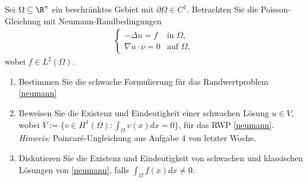 
\begin{exercise}

Sei $\Omega \subseteq \R^n$ ein beschränktes Gebiet mit $\partial\Omega \in C^1$.
Betrachten Sie die Poisson-Gleichung mit Neumann-Randbedingungen
\begin{align}
\begin{cases}
  -\Delta u = f & \text{in } \Omega, \\
  \nabla u \cdot \nu = 0 & \text{auf } \Omega,
\end{cases} \label{neumann}
\end{align}
wobei $f \in L^2(\Omega)$.
\begin{enumerate}[label = \alph*)]
  \item Bestimmen Sie die schwache Formulierung für das Randwertproblem \eqref{neumann}
  \item Beweisen Sie die Existenz und Eindeutigkeit einer schwachen Lösung $u \in V$,
  wobei $V := \{v \in H^1(\Omega): \int_\Omega v(x)dx = 0\}$, für das RWP \eqref{neumann}. \\
  \textit{Hinweis:} Poincaré-Ungleichung aus Aufgabe 4 von letzter Woche.
  \item Diskutieren Sie die Existenz und Eindeutigkeit von schwachen und klassischen
  Lösungen von \eqref{neumann}, falls $\int_\Omega f(x)dx \neq 0$.
\end{enumerate}
\end{exercise}


